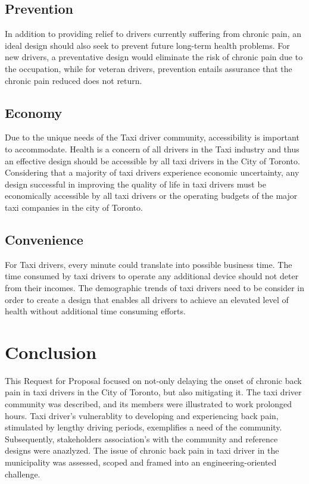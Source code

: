 \documentclass[11pt]{article}
\begin{document}
\subsection{Prevention}
In addition to providing relief to drivers currently suffering from 
chronic pain, an ideal design should also seek to prevent future long-term 
health problems. For new drivers, a preventative design would eliminate
the risk of chronic pain due to the occupation, while for veteran 
drivers, prevention entails assurance that the chronic pain reduced does
not return. 
 
\subsection{Economy}
Due to the unique needs of the Taxi driver community, accessibility is 
important to accommodate. Health is a concern of all drivers in the Taxi 
industry and thus an effective design should be accessible by all taxi 
drivers in the City of Toronto. Considering that a majority of taxi 
drivers experience economic uncertainty\cite{facey2003health}, any design 
successful in improving the quality of life in taxi drivers must be
economically accessible by all taxi drivers or the operating 
budgets of the major taxi companies in the city of Toronto. 
 
\subsection{Convenience}
For Taxi drivers, every minute could translate into possible business 
time\cite{ facey2003health}. The time consumed by taxi drivers to operate 
any additional device should not deter from their incomes. The demographic 
trends of taxi drivers need to be consider in order to create a design 
that enables all drivers to achieve an elevated level of health 
without additional time consuming efforts.

\section{Conclusion}
This Request for Proposal focused on not-only delaying the onset of chronic back pain
in taxi drivers in the City of Toronto, but also mitigating it.  
The taxi driver community was described, and its members were illustrated to work prolonged 
hours\cite{thestar2012, KneePain}. Taxi driver's vulnerablity to developing and experiencing 
back pain, stimulated by lengthy driving periods\cite{Okuribido2008, ODrivers@Risk}, 
exemplifies a need of the community. Subsequently, stakeholders association's with the 
community and reference designs were anazlyzed. The issue of chronic back pain in taxi driver 
in the municipality was assessed, scoped and framed into an engineering-oriented challenge.   



\end{document}
